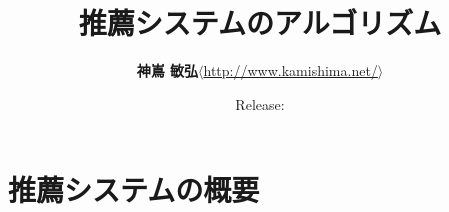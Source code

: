 \documentclass[11pt,a4paper,papersize,oneside]{jsbook}
\title{\LARGE\textbf{推薦システムのアルゴリズム}}
\author{\textbf{神嶌 敏弘}\quad$\langle$\url{http://www.kamishima.net/}$\rangle$}
\date{Release: }
\begin{document}
\frontmatter

\maketitle

\onehalfspacing




\tableofcontents

\mainmatter

\part{推薦システムの概要}
\label{part:overview}






\backmatter
\singlespacing





\printindex
\end{document}
